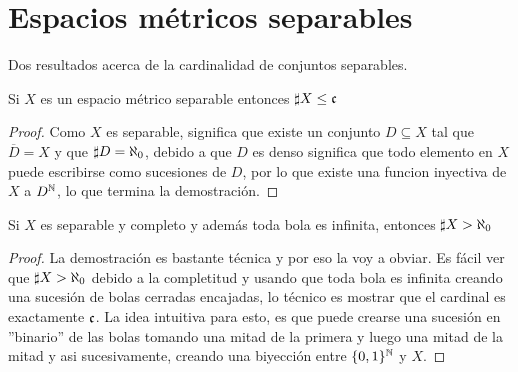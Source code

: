 \documentclass[12pt,a4paper]{book}
\begin{document}
\else
\fi

\section{Espacios métricos separables}
Dos resultados acerca de la cardinalidad de conjuntos separables.
\begin{prop}
Si $X$ es un espacio métrico separable entonces $\sharp X \leq \mathfrak{c}$
\begin{proof}
Como $X$ es separable, significa que existe un conjunto $D \subseteq X$ tal que $ \overline{D} = X$ y que $\sharp D = \a0$, debido a que $D$ es denso significa que todo elemento en $X$ puede escribirse como sucesiones de $D$, por lo que existe una funcion inyectiva de $X$ a $D^{\mathbb{N}}$, lo que termina la demostración.
\end{proof}
\end{prop}
\begin{prop}
Si $X$ es separable y completo y además toda bola es infinita, entonces $\sharp X > \a0$
\begin{proof}
La demostración es bastante técnica y por eso la voy a obviar. Es fácil ver que $\sharp X > \a0$ debido a la completitud y usando que toda bola es infinita creando una sucesión de bolas cerradas encajadas, lo técnico es mostrar que el cardinal es exactamente $\mathfrak{c}$. La idea intuitiva para esto, es que puede crearse una sucesión en ''binario'' de las bolas tomando una mitad de la primera y luego una mitad de la mitad y asi sucesivamente, creando una biyección entre $\{0,1\}^{\mathbb{N}}$ y $X$.
\end{proof}
\end{prop}


\ifx\isEmbedded\undefined
\end{document}
